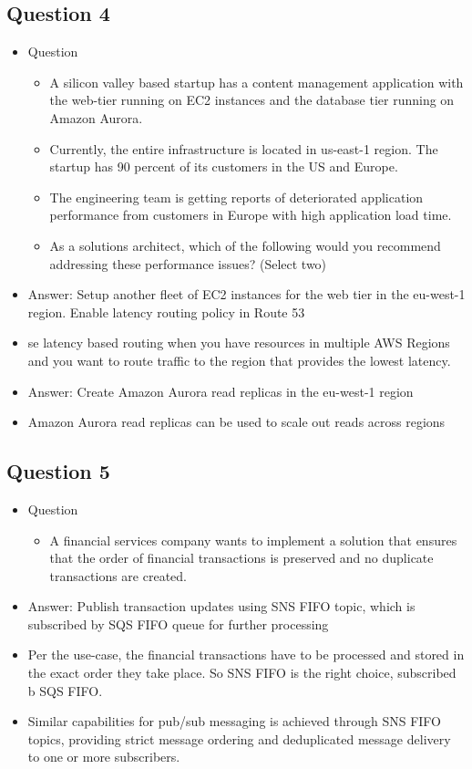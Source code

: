\documentclass[]{scrartcl}
\begin{document}
\subsection{Question 4}
\begin{itemize}
	\item Question
	\begin{itemize}
		\item A silicon valley based startup has a content management application with the web-tier running on EC2 instances and the database tier running on Amazon Aurora. 
		\item Currently, the entire infrastructure is located in us-east-1 region. The startup has 90 percent of its customers in the US and Europe. 
		\item The engineering team is getting reports of deteriorated application performance from customers in Europe with high application load time.
		\item As a solutions architect, which of the following would you recommend addressing these performance issues? (Select two)
	\end{itemize}
	\item Answer: Setup another fleet of EC2 instances for the web tier in the eu-west-1 region. Enable latency routing policy in Route 53
	\item se latency based routing when you have resources in multiple AWS Regions and you want to route traffic to the region that provides the lowest latency. 
	\item Answer: Create Amazon Aurora read replicas in the eu-west-1 region 
	\item Amazon Aurora read replicas can be used to scale out reads across regions
\end{itemize}

\subsection{Question 5}
\begin{itemize}
	\item Question
	\begin{itemize}
		\item A financial services company wants to implement a solution that ensures that the order of financial transactions is preserved and no duplicate transactions are created.
	\end{itemize}
	\item Answer: Publish transaction updates using SNS FIFO topic, which is subscribed by SQS FIFO queue for further processing
	\item Per the use-case, the financial transactions have to be processed and stored in the exact order they take place. So SNS FIFO is the right choice, subscribed b SQS FIFO.
	\item Similar capabilities for pub/sub messaging is achieved through SNS FIFO topics, providing strict message ordering and deduplicated message delivery to one or more subscribers.
\end{itemize}
\end{document}
